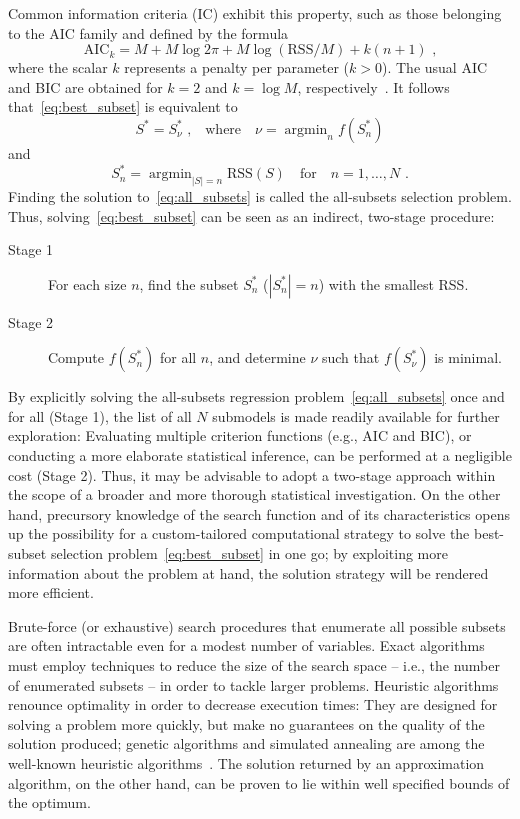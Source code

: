 \documentclass[article]{jss}
\newcommand{\rss}{\mathrm{RSS}}
\newcommand{\card}[1]{\left\lvert{#1}\right\rvert}
\DeclareMathOperator*{\argmin}{argmin}
\begin{document}
Common information criteria (IC) exhibit this property, such as those
belonging to the AIC family and defined by the formula
%
\begin{equation}
  \label{eq:aic}
  \text{AIC}_k=M+M\log2\pi+M\log(\rss/M)+k(n+1)\text{ ,}
\end{equation}
%
where the scalar $k$ represents a penalty per parameter ($k>0$).  The
usual AIC and BIC are obtained for $k=2$ and $k=\log M$,
respectively~\citep{miller:02}.  It follows
that~\eqref{eq:best_subset} is equivalent to
%
\begin{equation*}
  S^*=S^*_\nu\text{ ,}
  \quad\text{where}\quad
  \nu=\argmin_{n}f(S^*_n)
\end{equation*}
%
and
%
\begin{equation}
  \label{eq:all_subsets}
  S^*_n=\argmin_{\card{S}=n}\rss(S)
  \quad\text{for}\quad
  n=1,\dots,N\text{ .}
\end{equation}
%
Finding the solution to~\eqref{eq:all_subsets} is called the
all-subsets selection problem.  Thus, solving~\eqref{eq:best_subset}
can be seen as an indirect, two-stage procedure:
%
\begin{description}
\item[Stage 1] For each size $n$, find the subset $S^*_n$
  ($\card{S^*_n}=n$) with the smallest RSS.
\item[Stage 2] Compute $f(S^*_n)$ for all $n$, and determine $\nu$
  such that $f(S^*_\nu)$ is minimal.
\end{description}
%
By explicitly solving the all-subsets regression
problem~\eqref{eq:all_subsets} once and for all (Stage 1), the list of
all $N$ submodels is made readily available for further exploration:
Evaluating multiple criterion functions (e.g., AIC and BIC), or
conducting a more elaborate statistical inference, can be performed at
a negligible cost (Stage 2).  Thus, it may be advisable to adopt a
two-stage approach within the scope of a broader and more thorough
statistical investigation.  On the other hand, precursory knowledge of
the search function and of its characteristics opens up the
possibility for a custom-tailored computational strategy to solve the
best-subset selection problem~\eqref{eq:best_subset} in one go; by
exploiting more information about the problem at hand, the solution
strategy will be rendered more efficient.

Brute-force (or exhaustive) search procedures that enumerate all
possible subsets are often intractable even for a modest number of
variables.  Exact algorithms must employ techniques to reduce the size
of the search space -- i.e., the number of enumerated subsets -- in
order to tackle larger problems.  Heuristic algorithms renounce
optimality in order to decrease execution times: They are designed for
solving a problem more quickly, but make no guarantees on the quality
of the solution produced; genetic algorithms and simulated annealing
are among the well-known heuristic
algorithms~\citep{goldberg:89,otten:89}.  The solution returned by an
approximation algorithm, on the other hand, can be proven to lie
within well specified bounds of the optimum.
\end{document}
